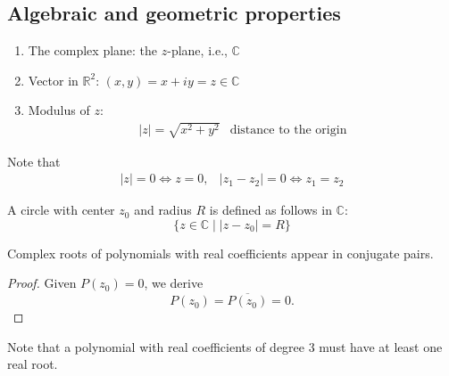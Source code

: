 \subsection{Algebraic and geometric properties}
\begin{definition}
\begin{enumerate}
\item
The complex plane: the $z$-plane, i.e., $\mathbb{C}$
\item
Vector in $\mathbb{R}^2$: $(x,y) = x+iy=z\in\mathbb{C}$
\item
Modulus of $z$:
\[
\begin{array}{ll}
|z|=\sqrt{x^2+y^2}
&
\mbox{distance to the origin}
\end{array}
\]
\end{enumerate}
\end{definition}
Note that
\[
\begin{array}{ll}
|z|=0\Longleftrightarrow z=0,
&
|z_1 - z_2| = 0\Longleftrightarrow
z_1=z_2
\end{array}
\]
\begin{definition}
A circle with center $z_0$ and radius $R$ is defined as follows in $\mathbb{C}$:
\[
\{z\in\mathbb{C}\mid |z-z_0|=R\}
\]
\end{definition}
\begin{proposition}
Complex roots of polynomials with real coefficients appear in conjugate pairs.
\end{proposition}
\begin{proof}
Given $P(z_0)=0$, we derive
\[
P(z_0)=\overline{P(z_0)}=0.
\]
\end{proof}
Note that a polynomial with real coefficients of degree 3 must have at least one real root.

